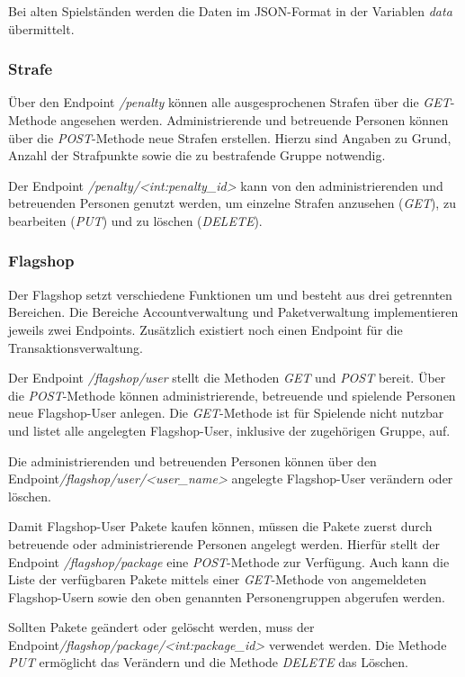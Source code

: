 Bei alten Spielständen werden die Daten im JSON-Format in der Variablen \textit{data} übermittelt.

\subsubsection{Strafe}
Über den Endpoint \textit{/penalty} können alle ausgesprochenen Strafen über die \textit{GET}-Methode angesehen werden. Administrierende und betreuende Personen können über die \textit{POST}-Methode neue Strafen erstellen. Hierzu sind Angaben zu Grund, Anzahl der Strafpunkte sowie die zu bestrafende Gruppe notwendig.

Der Endpoint \textit{/penalty/<int:penalty\_id>} kann von den administrierenden und betreuenden Personen genutzt werden, um einzelne Strafen anzusehen (\textit{GET}), zu bearbeiten (\textit{PUT}) und zu löschen (\textit{DELETE}).

\subsubsection{Flagshop}
Der Flagshop setzt verschiedene Funktionen um und besteht aus drei getrennten Bereichen. Die Bereiche Accountverwaltung und Paketverwaltung implementieren jeweils zwei Endpoints. Zusätzlich existiert noch einen Endpoint für die Transaktionsverwaltung. 

Der Endpoint \textit{/flagshop/user} stellt die Methoden \textit{GET} und \textit{POST} bereit. Über die \textit{POST}-Methode können administrierende, betreuende und spielende Personen neue Flagshop-User anlegen. Die \textit{GET}-Methode ist für Spielende nicht nutzbar und listet alle angelegten Flagshop-User, inklusive der zugehörigen Gruppe, auf.

Die administrierenden und betreuenden Personen können über den Endpoint\linebreak \textit{/flagshop/user/<user\_name>} angelegte Flagshop-User verändern oder löschen.

Damit Flagshop-User Pakete kaufen können, müssen die Pakete zuerst durch betreuende oder administrierende Personen angelegt werden. Hierfür stellt der Endpoint \textit{/flagshop/package} eine \textit{POST}-Methode zur Verfügung. Auch kann die Liste der verfügbaren Pakete mittels einer \textit{GET}-Methode von angemeldeten Flagshop-Usern sowie den oben genannten Personengruppen abgerufen werden.

Sollten Pakete geändert oder gelöscht werden, muss der Endpoint\linebreak \textit{/flagshop/package/<int:package\_id>} verwendet werden. Die Methode \textit{PUT} ermöglicht das Verändern und die Methode \textit{DELETE} das Löschen.

